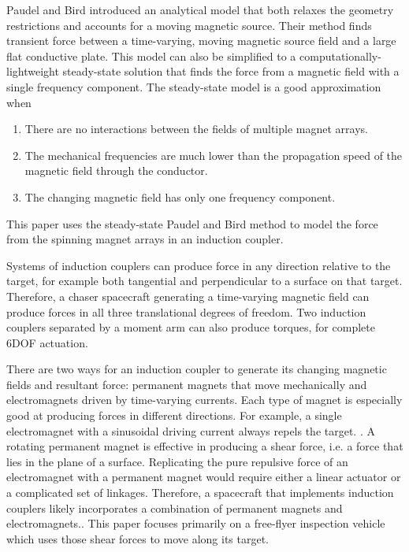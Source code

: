 Paudel and Bird introduced an analytical model that both relaxes the geometry restrictions and accounts for a moving magnetic source. Their method finds transient force between a time-varying, moving magnetic source field and a large flat conductive plate. \cite{Paudel2012t}
This model can also be simplified to a computationally-lightweight steady-state solution that finds the force from a magnetic field with a single frequency component. \cite{Paudel2012ss}
The steady-state model is a good approximation when 
\begin{enumerate}
\item There are no interactions between the fields of multiple magnet arrays. 
\item The mechanical frequencies are much lower than the propagation speed of the magnetic field through the conductor.
\item The changing magnetic field has only one frequency component.
\end{enumerate}
This paper uses the steady-state Paudel and Bird method to model the force from the spinning magnet arrays in an induction coupler. 
 
Systems of induction couplers can produce force in any direction relative to the target, for example both tangential and perpendicular to a surface on that target. Therefore, a chaser spacecraft generating a time-varying magnetic field can produce forces in all three translational degrees of freedom. Two induction couplers separated by a moment arm can also produce torques, for complete 6DOF actuation.

There are two ways for an induction coupler to generate its changing magnetic fields and resultant force: permanent magnets that move mechanically and electromagnets driven by time-varying currents. Each type of magnet is especially good at producing forces in different directions. For example, a single electromagnet with a sinusoidal driving current always repels the target. \cite{Reinhardt2012}.  A rotating permanent magnet is effective in producing a shear force, i.e. a force that lies in the plane of a surface.  Replicating the pure repulsive force of an electromagnet with a permanent magnet would require either a linear actuator or a complicated set of linkages. Therefore, a spacecraft that implements induction couplers likely incorporates a combination of permanent magnets and electromagnets..  This paper focuses primarily on a free-flyer inspection vehicle which uses those shear forces to move along its target. 